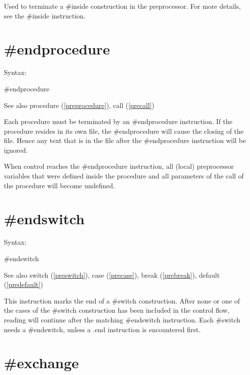\noindent Used to terminate a \#inside construction in 
the preprocessor. For more details, see the \#inside 
instruction.


\section{\#endprocedure}
\label{preendprocedure}

\noindent Syntax:

\#endprocedure
 
\noindent See also procedure (\ref{preprocedure}), call
(\ref{precall})

\noindent Each procedure must be terminated by an 
\#endprocedure instruction. If the procedure resides 
in its own file, the \#endprocedure will cause the closing of the file. 
Hence any text that is in the file after the \#endprocedure instruction 
will be ignored.

When control reaches the \#endprocedure instruction, all (local) 
preprocessor variables that were defined 
inside the procedure and all parameters of the call of the procedure will 
become undefined.


\section{\#endswitch}
\label{preendswitch}

\noindent Syntax:

\#endswitch
 
\noindent See also switch (\ref{preswitch}),
        case (\ref{precase}),
        break (\ref{prebreak}),
        default (\ref{predefault})

\noindent This instruction marks the end of a 
\#switch construction. After none or one of the cases of 
the \#switch construction has been included in the control flow, reading 
will continue after the matching \#endswitch instruction. Each \#switch 
needs a \#endswitch, unless a .end instruction is encountered first.


\section{\#exchange}
\label{preexchange}

